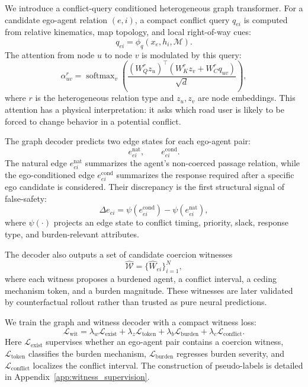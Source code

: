 \documentclass[10pt]{article}
\begin{document}
We introduce a conflict-query conditioned heterogeneous graph transformer. For a candidate ego-agent relation $(e,i)$, a compact conflict query $q_{ei}$ is computed from relative kinematics, map topology, and local right-of-way cues:
\begin{equation}
    q_{ei} = \phi_q(x_e, h_i, \mathcal{M}).
\end{equation}
The attention from node $u$ to node $v$ is modulated by this query:
\begin{equation}
    \alpha^{r}_{uv}
    =
    \operatorname{softmax}_{v}
    \left(
    \frac{
    (W^{r}_{Q} z_u)^\top
    (W^{r}_{K} z_v + W^{r}_{C} q_{uv})
    }{\sqrt{d}}
    \right),
\end{equation}
where $r$ is the heterogeneous relation type and $z_u,z_v$ are node embeddings. This attention has a physical interpretation: it asks which road user is likely to be forced to change behavior in a potential conflict.

The graph decoder predicts two edge states for each ego-agent pair:
\begin{equation}
    e^{\mathrm{nat}}_{ei}, \qquad e^{\mathrm{cond}}_{ei}.
\end{equation}
The natural edge $e^{\mathrm{nat}}_{ei}$ summarizes the agent's non-coerced passage relation, while the ego-conditioned edge $e^{\mathrm{cond}}_{ei}$ summarizes the response required after a specific ego candidate is considered. Their discrepancy is the first structural signal of false-safety:
\begin{equation}
    \Delta e_{ei}
    =
    \psi(e^{\mathrm{cond}}_{ei})-\psi(e^{\mathrm{nat}}_{ei}),
\end{equation}
where $\psi(\cdot)$ projects an edge state to conflict timing, priority, slack, response type, and burden-relevant attributes.

The decoder also outputs a set of candidate coercion witnesses
\begin{equation}
    \widehat{\mathcal{W}} =
    \{ \widehat{W}_{ei} \}_{i=1}^{N},
\end{equation}
where each witness proposes a burdened agent, a conflict interval, a ceding mechanism token, and a burden magnitude. These witnesses are later validated by counterfactual rollout rather than trusted as pure neural predictions.

We train the graph and witness decoder with a compact witness loss:
\begin{equation}
    \mathcal{L}_{\mathrm{wit}}
    =
    \lambda_w \mathcal{L}_{\mathrm{exist}}
    +
    \lambda_z \mathcal{L}_{\mathrm{token}}
    +
    \lambda_b \mathcal{L}_{\mathrm{burden}}
    +
    \lambda_c \mathcal{L}_{\mathrm{conflict}} .
\end{equation}
Here $\mathcal{L}_{\mathrm{exist}}$ supervises whether an ego-agent pair contains a coercion witness, $\mathcal{L}_{\mathrm{token}}$ classifies the burden mechanism, $\mathcal{L}_{\mathrm{burden}}$ regresses burden severity, and $\mathcal{L}_{\mathrm{conflict}}$ localizes the conflict interval. The construction of pseudo-labels is detailed in Appendix~\ref{app:witness_supervision}.
\end{document}
